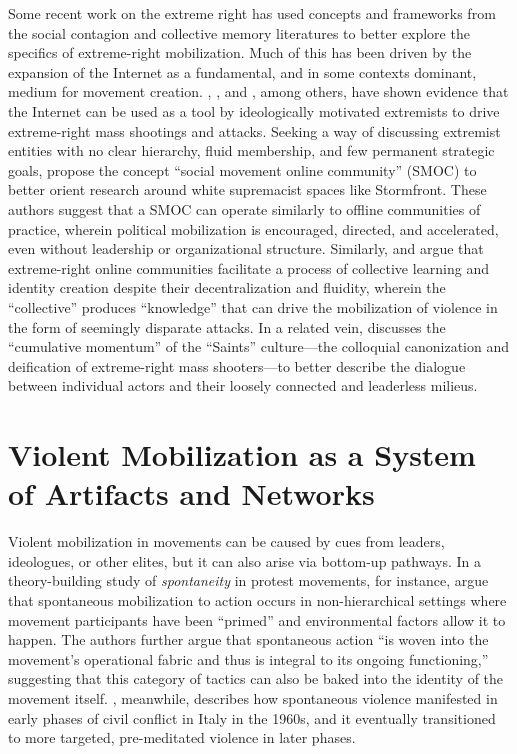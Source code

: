 \documentclass[12pt]{article}
\begin{document}
Some recent work on the extreme right has used concepts and frameworks from the social contagion and collective memory literatures to better explore the specifics of extreme-right mobilization. Much of this has been driven by the expansion of the Internet as a fundamental, and in some contexts dominant, medium for movement creation. \textcite{zeman2017role}, \textcite{marwick2022far}, and \textcite{vanderwee2023testing}, among others, have shown evidence that the Internet can be used as a tool by ideologically motivated extremists to drive extreme-right mass shootings and attacks. Seeking a way of discussing extremist entities with no clear hierarchy, fluid membership, and few permanent strategic goals, \textcite{caren2012social} propose the concept ``social movement online community'' (SMOC) to better orient research around white supremacist spaces like Stormfront. These authors suggest that a SMOC can operate similarly to offline communities of practice, wherein political mobilization is encouraged, directed, and accelerated, even without leadership or organizational structure. Similarly, \textcite{furstenberg2023decentralized} and \textcite{lee2022fascist} argue that extreme-right online communities facilitate a process of collective learning and identity creation despite their decentralization and fluidity, wherein the ``collective'' produces ``knowledge'' that can drive the mobilization of violence in the form of seemingly disparate attacks. In a related vein, \textcite{macklin2022praise} discusses the ``cumulative momentum'' of the ``Saints'' culture---the colloquial canonization and deification of extreme-right mass shooters---to better describe the dialogue between individual actors and their loosely connected and leaderless milieus.

\section{Violent Mobilization as a System of Artifacts and Networks}

Violent mobilization in movements can be caused by cues from leaders, ideologues, or other elites, but it can also arise via bottom-up pathways. In a theory-building study of \textit{spontaneity} in protest movements, for instance, \textcite{snow2014protest} argue that spontaneous mobilization to action occurs in non-hierarchical settings where movement participants have been ``primed'' and environmental factors allow it to happen. The authors further argue that spontaneous action ``is woven into the movement's operational fabric and thus is integral to its ongoing functioning,'' suggesting that this category of tactics can also be baked into the identity of the movement itself. \textcite{rucht2003violence}, meanwhile, describes how spontaneous violence manifested in early phases of civil conflict in Italy in the 1960s, and it eventually transitioned to more targeted, pre-meditated violence in later phases.
\end{document}
